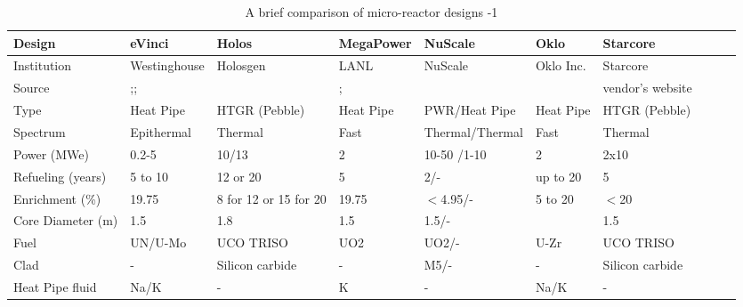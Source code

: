 \pagebreak
{}
\begin{landscape}
\begin{table} [ht]
\begin{center}

\caption{A brief comparison of micro-reactor designs -1}
\label{microreactors-1}
\begin{tabular}{|l|l|l|l|l|l|l|l|l|l|}
\hline 
Design 		&eVinci 		& Holos		&MegaPower 	& NuScale		& Oklo 		& Starcore		 \\ 
\hline 
Institution 	&Westinghouse& Holosgen	&LANL	& NuScale		& Oklo Inc. 	& Starcore		\\ 
Source 	&\cite{levinsky_westinghouse_2018};\cite{yan_technology_2020};\cite{arafat_evinci_2019}  &\cite{filippone_holos_2017}  	& \cite{mcclure_design_2015};\cite{sterbentz_special_2017}	& \cite{nuscale_chapter_2018} 		& \cite{oklo_inc._pilot_2018} 	&vendor's website		\\ 
Type			&Heat Pipe	& HTGR (Pebble)	  	& Heat Pipe 		& PWR/Heat Pipe&Heat Pipe   			&	HTGR (Pebble)			\\ 
Spectrum		&Epithermal	& Thermal 		 	&Fast  	&Thermal/Thermal 		&Fast   			& Thermal  			\\ 
Power (MWe)	&0.2-5		& 10/13  			&2			& 10-50 /1-10			& 2  			&2x10  			\\ 
Refueling (years)&5 to 10		&12 or 20   			&	5		& 2/- 			& up to 20  			&5  			\\ 
Enrichment (\%)&19.75		&8 for 12 or 15 for 20   			&19.75			& $<$4.95/- 		&  5 to 20 			&$<$20	  			\\ 
Core  Diameter (m)	&1.5		& 1.8  			&1.5			& 1.5/- 		&   			&1.5   			\\ 
Fuel			&UN/U-Mo	& UCO TRISO  			&	UO2		&UO2/-		&  U-Zr 			& UCO TRISO  			\\ 
Clad			&-		&  Silicon carbide 			&	-		& M5/- 		&   -			&Silicon carbide   			\\ 
Heat Pipe fluid	&Na/K	& -  			&K			& - 		& Na/K 			&  - 	\\ 
\hline
\end{tabular}


\end{center}
\end{table}
\end{landscape}
